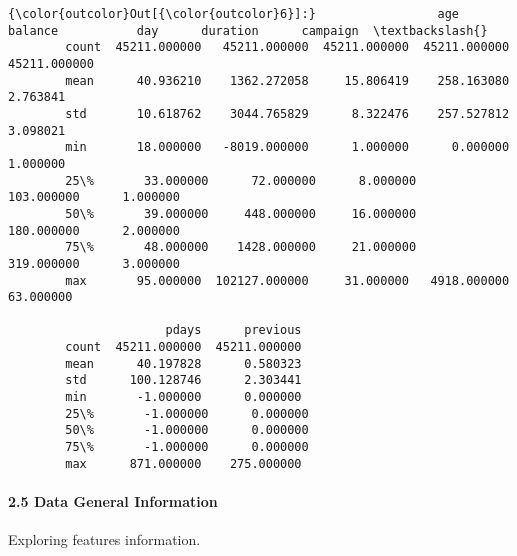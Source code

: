 \documentclass[11pt]{article}
\begin{document}
\begin{Verbatim}[commandchars=\\\{\}]
{\color{outcolor}Out[{\color{outcolor}6}]:}                 age        balance           day      duration      campaign  \textbackslash{}
        count  45211.000000   45211.000000  45211.000000  45211.000000  45211.000000   
        mean      40.936210    1362.272058     15.806419    258.163080      2.763841   
        std       10.618762    3044.765829      8.322476    257.527812      3.098021   
        min       18.000000   -8019.000000      1.000000      0.000000      1.000000   
        25\%       33.000000      72.000000      8.000000    103.000000      1.000000   
        50\%       39.000000     448.000000     16.000000    180.000000      2.000000   
        75\%       48.000000    1428.000000     21.000000    319.000000      3.000000   
        max       95.000000  102127.000000     31.000000   4918.000000     63.000000   
        
                      pdays      previous  
        count  45211.000000  45211.000000  
        mean      40.197828      0.580323  
        std      100.128746      2.303441  
        min       -1.000000      0.000000  
        25\%       -1.000000      0.000000  
        50\%       -1.000000      0.000000  
        75\%       -1.000000      0.000000  
        max      871.000000    275.000000  
\end{Verbatim}
            
    \paragraph{2.5 Data General Information}\label{data-general-information}

Exploring features information.
\end{document}
